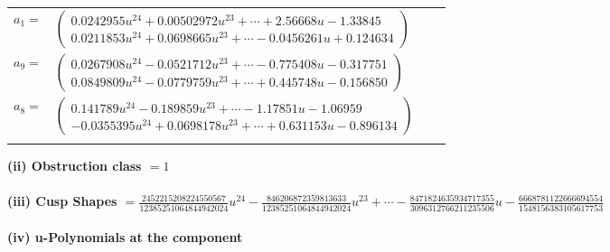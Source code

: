 \documentclass[1p]{elsarticle_modified}
\theoremstyle{definition}
\begin{document}
\begin{tabular}{m{7pt} m{180pt} m{7pt} m{180pt} }
\flushright $a_{1}=$&$\begin{pmatrix}0.0242955 u^{24}+0.00502972 u^{23}+\cdots+2.56668 u-1.33845\\0.0211853 u^{24}+0.0698665 u^{23}+\cdots-0.0456261 u+0.124634\end{pmatrix}$ \\
\flushright $a_{9}=$&$\begin{pmatrix}0.0267908 u^{24}-0.0521712 u^{23}+\cdots-0.775408 u-0.317751\\0.0849809 u^{24}-0.0779759 u^{23}+\cdots+0.445748 u-0.156850\end{pmatrix}$ \\
\flushright $a_{8}=$&$\begin{pmatrix}0.141789 u^{24}-0.189859 u^{23}+\cdots-1.17851 u-1.06959\\-0.0355395 u^{24}+0.0698178 u^{23}+\cdots+0.631153 u-0.896134\end{pmatrix}$\\&\end{tabular}
\flushleft \textbf{(ii) Obstruction class $= 1$}\\~\\
\flushleft \textbf{(iii) Cusp Shapes $= \frac{2452215208224550567}{12385251064844942024} u^{24}-\frac{846206872359813633}{12385251064844942024} u^{23}+\cdots-\frac{8471824635934717355}{3096312766211235506} u-\frac{6668781122666694554}{1548156383105617753}$}\\~\\
\newpage\renewcommand{\arraystretch}{1}
\flushleft \textbf{(iv) u-Polynomials at the component}\newline \\
\end{document}
